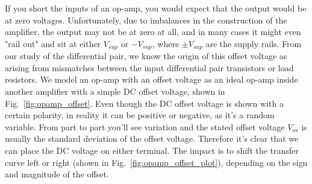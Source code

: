 If you short the inputs of an op-amp, you would expect that the output would be at zero voltages.  Unfortunately, due to imbalances in the construction of the amplifier, the output may not be at zero at all, and in many cases it might even "rail out" and sit at either $V_{sup}$ or $-V_{sup}$, where $\pm V_{sup}$ are the supply rails.  From our study of the differential pair, we know the origin of this offset voltage as arising from mismatches between the input differential pair transistors or load resistors.  
We model an op-amp with an offset voltage as an ideal op-amp inside another amplifier with a simple DC offset voltage, shown in Fig.~\ref{fig:opamp_offset}.  Even though the DC offset voltage is shown with a certain polarity, in reality it can be positive or negative, as it's a random variable.  From part to part you'll see variation and the stated offset voltage $V_{os}$ is usually the standard deviation of the offset voltage.  Therefore it's clear that we can place the DC voltage on either terminal.  The impact is to shift the transfer curve left or right (shown in Fig.~\ref{fig:opamp_offset_plot}), depending on the sign and magnitude of the offset.
